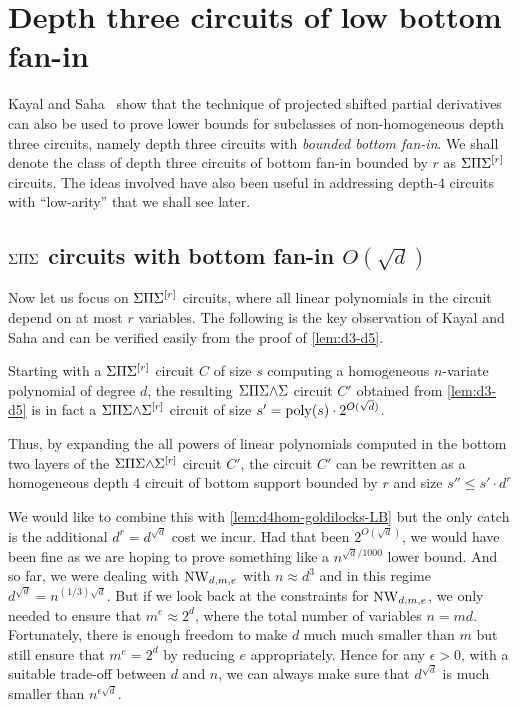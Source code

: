 \chapter{Depth three circuits of low bottom fan-in}
\label{chap:lowbottomfanind3}

Kayal and Saha~\cite{KayalSaha14} show that the technique of projected shifted partial derivatives can also be used to prove lower bounds for subclasses of non-homogeneous depth three circuits, namely depth three circuits with \emph{bounded bottom fan-in}.
We shall denote the class of depth three circuits of bottom fan-in bounded by $r$ as $\Sigma\Pi\Sigma^{[r]}$ circuits.
The ideas involved have also been useful in addressing depth-$4$ circuits with ``low-arity'' \cite{KumarSaraf15,KayalSaha15} that we shall see later. 

\section{$\Sigma\Pi\Sigma$ circuits with bottom fan-in $O(\sqrt{d})$}

Now let us focus on $\Sigma\Pi\Sigma^{[r]}$ circuits, where all linear polynomials in the circuit depend on at most $r$ variables.
The following is the key observation of Kayal and Saha \cite{KayalSaha14} and can be verified easily from the proof of \autoref{lem:d3-d5}.

\begin{observation}\label{obs:d3-d5-fanin}
  Starting with a $\Sigma\Pi\Sigma^{[r]}$ circuit $C$ of size $s$ computing a homogeneous $n$-variate polynomial of degree $d$, the resulting $\Sigma\Pi\Sigma\mathord{\wedge}\Sigma$ circuit $C'$ obtained from \autoref{lem:d3-d5} is in fact a $\Sigma\Pi\Sigma\mathord{\wedge}\Sigma^{[r]}$ circuit of size $s' = \operatorname{poly}(s) \cdot 2^{O(\sqrt{d})}$.

  Thus, by expanding the all powers of linear polynomials computed in the bottom two layers of the $\Sigma\Pi\Sigma\mathord{\wedge}\Sigma^{[r]}$ circuit $C'$, the circuit $C'$ can be rewritten as a homogeneous depth $4$ circuit of bottom support bounded by $r$ and size $s'' \leq s' \cdot d^r$
\end{observation}

We would like to combine this with \autoref{lem:d4hom-goldilocks-LB} but the only catch is the additional $d^r = d^{\sqrt{d}}$ cost we incur.
Had that been $2^{O(\sqrt{d})}$, we would have been fine as we are hoping to prove something like a $n^{\sqrt{d}/1000}$ lower bound.
And so far, we were dealing with $\operatorname{\mathrm{NW}}_{d,m,e}$ with $n \approx d^3$ and in this regime $d^{\sqrt{d}} = n^{(1/3)\sqrt{d}}$.
But if we look back at the constraints for $\operatorname{\mathrm{NW}}_{d,m,e}$, we only needed to ensure that $m^e \approx 2^d$, where the total number of variables $n = md$.
Fortunately, there is enough freedom to make $d$ much much smaller than $m$ but still ensure that $m^e = 2^d$ by reducing $e$ appropriately. Hence for any $\epsilon > 0$, with a suitable trade-off between $d$ and $n$, we can always make sure that $d^{\sqrt{d}}$ is much smaller than $n^{\epsilon \sqrt{d}}$. 

